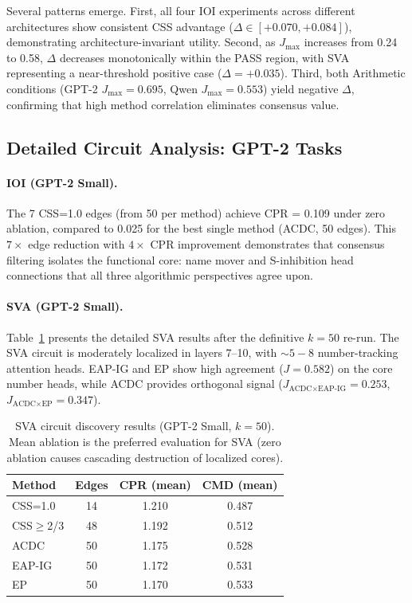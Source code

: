 \documentclass[11pt]{article}
\newcommand{\css}{\textsc{CSS}}
\newcommand{\cssone}{\textsc{CSS}{=}1.0}
\begin{document}
Several patterns emerge. First, all four IOI experiments across different architectures show consistent \css{} advantage ($\Delta \in [+0.070, +0.084]$), demonstrating architecture-invariant utility. Second, as $J_{\max}$ increases from 0.24 to 0.58, $\Delta$ decreases monotonically within the PASS region, with SVA representing a near-threshold positive case ($\Delta = +0.035$). Third, both Arithmetic conditions (GPT-2 $J_{\max} = 0.695$, Qwen $J_{\max} = 0.553$) yield negative $\Delta$, confirming that high method correlation eliminates consensus value.

\subsection{Detailed Circuit Analysis: GPT-2 Tasks}
\label{sec:gpt2_detail}

\paragraph{IOI (GPT-2 Small).} The 7 \cssone{} edges (from 50 per method) achieve CPR = 0.109 under zero ablation, compared to 0.025 for the best single method (ACDC, 50 edges). This $7\times$ edge reduction with $4\times$ CPR improvement demonstrates that consensus filtering isolates the functional core: name mover and S-inhibition head connections that all three algorithmic perspectives agree upon.

\paragraph{SVA (GPT-2 Small).} Table~\ref{tab:sva_detail} presents the detailed SVA results after the definitive $k=50$ re-run. The SVA circuit is moderately localized in layers 7--10, with ${\sim}5{-}8$ number-tracking attention heads. EAP-IG and EP show high agreement ($J = 0.582$) on the core number heads, while ACDC provides orthogonal signal ($J_{\text{ACDC}\times\text{EAP-IG}} = 0.253$, $J_{\text{ACDC}\times\text{EP}} = 0.347$).

\begin{table}[t]
\centering
\caption{SVA circuit discovery results (GPT-2 Small, $k=50$). Mean ablation is the preferred evaluation for SVA (zero ablation causes cascading destruction of localized cores).}
\label{tab:sva_detail}
\small
\begin{tabular}{lccc}
\toprule
\textbf{Method} & \textbf{Edges} & \textbf{CPR (mean)} & \textbf{CMD (mean)} \\
\midrule
CSS=1.0 & 14 & 1.210 & 0.487 \\
CSS$\geq$2/3 & 48 & 1.192 & 0.512 \\
ACDC & 50 & 1.175 & 0.528 \\
EAP-IG & 50 & 1.172 & 0.531 \\
EP & 50 & 1.170 & 0.533 \\
\bottomrule
\end{tabular}
\end{table}
\end{document}
